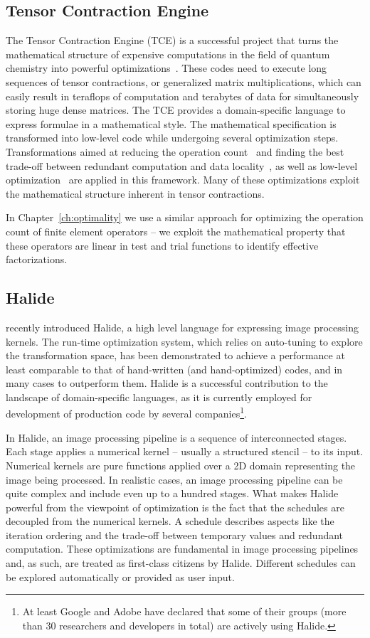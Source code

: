 \subsection{Tensor Contraction Engine}
\label{sec:bkg:tce}
The Tensor Contraction Engine (TCE) is a successful project that turns the mathematical structure of expensive computations in the field of quantum chemistry into powerful optimizations~\citep{TCE-url}. These codes need to execute long sequences of tensor contractions, or generalized matrix multiplications, which can easily result in teraflops of computation and terabytes of data for simultaneously storing huge dense matrices. The TCE provides a domain-specific language to express formulae in a mathematical style. The mathematical specification is transformed into low-level code while undergoing several optimization steps. Transformations aimed at reducing the operation count~\citep{TCE-2006,TCE-2009} and finding the best trade-off between redundant computation and data locality~\citep{TCE-2011}, as well as low-level optimization~\citep{TCE-2012} are applied in this framework. Many of these optimizations exploit the mathematical structure inherent in tensor contractions.

In Chapter~\ref{ch:optimality} we use a similar approach for optimizing the operation count of finite element operators -- we exploit the mathematical property that these operators are linear in test and trial functions to identify effective factorizations.


\subsection{Halide}
\cite{Halide} recently introduced Halide, a high level language for expressing image processing kernels. The run-time optimization system, which relies on auto-tuning to explore the transformation space, has been demonstrated to achieve a performance at least comparable to that of hand-written (and hand-optimized) codes, and in many cases to outperform them. Halide is a successful contribution to the landscape of domain-specific languages, as it is currently employed for development of production code by several companies\footnote{At least Google and Adobe have declared that some of their groups (more than 30 researchers and developers in total) are actively using Halide.}.

In Halide, an image processing pipeline is a sequence of interconnected stages. Each stage applies a numerical kernel -- usually a structured stencil -- to its input. Numerical kernels are pure functions applied over a 2D domain representing the image being processed. In realistic cases, an image processing pipeline can be quite complex and include even up to a hundred stages. What makes Halide powerful from the viewpoint of optimization is the fact that the schedules are decoupled from the numerical kernels. A schedule describes aspects like the iteration ordering and the trade-off between temporary values and redundant computation. These optimizations are fundamental in image processing pipelines and, as such, are treated as first-class citizens by Halide. Different schedules can be explored automatically or provided as user input.


